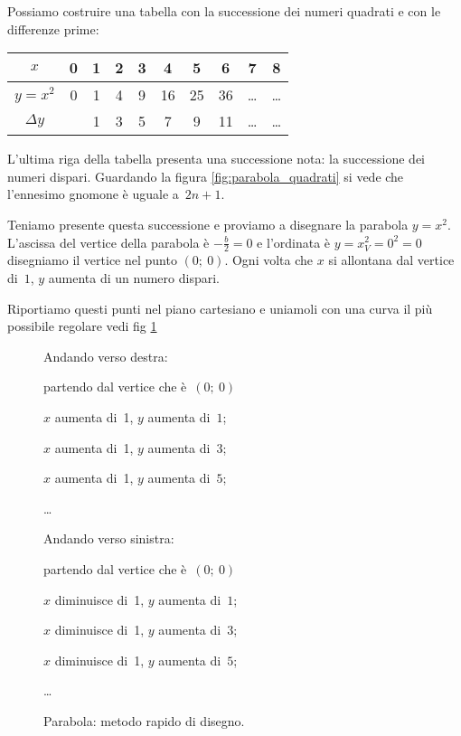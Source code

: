 Possiamo costruire una tabella con la successione dei numeri quadrati e con 
le differenze prime:

\begin{center}
  \begin{tabular}{c c c c c c c c c c}
   $x$        & 0 & 1 & 2 & 3 & 4 & 5 & 6 & 7 & 8 \\
   \hline
   $y=x^2$    & 0 & 1 & 4 & 9 & 16 & 25 & 36 & \ldots & \ldots \\
   \hline
   $\Delta y$ &  & 1 & 3 & 5 & 7 & 9 & 11 & \ldots & \ldots \\
  \end{tabular}
\end{center}
L'ultima riga della tabella presenta una successione nota: la successione dei 
numeri dispari. Guardando la figura \ref{fig:parabola_quadrati} si vede che 
l'ennesimo gnomone è uguale a~$2n+1$. 

Teniamo presente questa successione e proviamo a disegnare la parabola $y=x^2$.
L'ascissa del vertice della parabola è $-\frac{b}{2}=0$ e l'ordinata è 
$y=x_V^2=0^2=0$ disegniamo il vertice nel punto $(0;~0)$. Ogni volta che $x$ 
si allontana dal vertice di~$1$, $y$ aumenta di un numero dispari. 

Riportiamo questi punti nel piano cartesiano e uniamoli con una curva il più 
possibile regolare vedi fig \ref{fig:parabola_parabola0}


\begin{figure}[p]
\begin{minipage}{.50\textwidth}
Andando verso destra:
 \begin{itemize*}
 \item partendo dal vertice che è~$(0;~0)$
 \item $x$ aumenta di~1, $y$ aumenta di~$1$;
 \item $x$ aumenta di~1, $y$ aumenta di~$3$;
 \item $x$ aumenta di~1, $y$ aumenta di~$5$;
 \item \dots
\end{itemize*}
Andando verso sinistra:
\begin{itemize*}
 \item partendo dal vertice che è~$(0;~0)$
 \item $x$ diminuisce di~1, $y$ aumenta di~$1$;
 \item $x$ diminuisce di~1, $y$ aumenta di~$3$;
 \item $x$ diminuisce di~1, $y$ aumenta di~$5$;
 \item \dots
\end{itemize*}
\end{minipage}
\begin{minipage}{.50\textwidth}
\begin{inaccessibleblock}[Parabola di equazione $y=x^2$.]
\centering
  \disrapido
  \caption{Parabola: metodo rapido di disegno.} \label{fig:parabola_parabola0}
\end{inaccessibleblock}
\end{minipage}
\end{figure}

